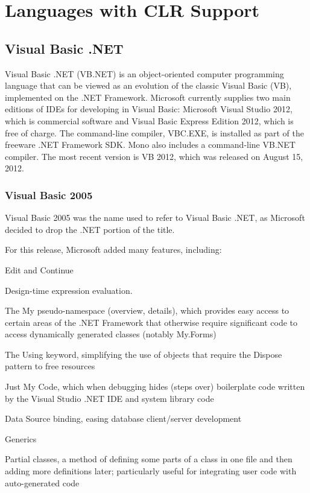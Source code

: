 \chapter{Languages with CLR Support}
\label{Languages with CLR Support}

\section{Visual Basic .NET}

Visual Basic .NET (VB.NET) is an object-oriented computer programming language that can be viewed as an evolution of the classic Visual Basic (VB), implemented on the .NET Framework. Microsoft currently supplies two main editions of IDEs for developing in Visual Basic: Microsoft Visual Studio 2012, which is commercial software and Visual Basic Express Edition 2012, which is free of charge. The command-line compiler, VBC.EXE, is installed as part of the freeware .NET Framework SDK. Mono also includes a command-line VB.NET compiler. The most recent version is VB 2012, which was released on August 15, 2012.

\subsection{Visual Basic 2005}
Visual Basic 2005 was the name used to refer to Visual Basic .NET, as Microsoft decided to drop the .NET portion of the title.

For this release, Microsoft added many features, including:

Edit and Continue

Design-time expression evaluation.

The My pseudo-namespace (overview, details), which provides easy access to certain areas of the .NET Framework that otherwise require significant code to access dynamically generated classes (notably My.Forms)

The Using keyword, simplifying the use of objects that require the Dispose pattern to free resources

Just My Code, which when debugging hides (steps over) boilerplate code written by the Visual Studio .NET IDE and system library code

Data Source binding, easing database client/server development

Generics

Partial classes, a method of defining some parts of a class in one file and then adding more definitions later; particularly useful for integrating user code with auto-generated code

